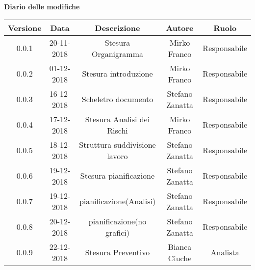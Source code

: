 	\begin{center}
		\textbf{Diario delle modifiche}
	\end{center}
	\begin{center}
		\begin{tabular}{|c|c|c|c|c|}
			\hline
			\textbf{Versione} & \textbf{Data} & \textbf{Descrizione} & \textbf{Autore} & \textbf{Ruolo} \\
			\hline
			0.0.1 & 20-11-2018 & Stesura Organigramma & Mirko Franco & Responsabile\\
			\hline
			0.0.2 & 01-12-2018 & Stesura introduzione & Mirko Franco & Responsabile\\
			\hline
			0.0.3 & 16-12-2018 & Scheletro documento &Stefano Zanatta & Responsabile\\
			\hline
			0.0.4 & 17-12-2018 & Stesura Analisi dei Rischi & Mirko Franco & Responsabile\\
			\hline
			0.0.5 & 18-12-2018 & Struttura suddivisione lavoro & Stefano Zanatta & Responsabile\\
			\hline
			0.0.6 & 19-12-2018 & Stesura pianificazione & Stefano Zanatta & Responsabile\\
			\hline
			0.0.7 & 19-12-2018 & pianificazione(Analisi) & Stefano Zanatta & Responsabile\\
			\hline
			0.0.8 & 20-12-2018 & pianificazione(no grafici) & Stefano Zanatta & Responsabile\\
			\hline
			0.0.9 & 22-12-2018 & Stesura Preventivo & Bianca Ciuche & Analista\\
			\hline
			
		\end{tabular}
	\end{center}
\newpage